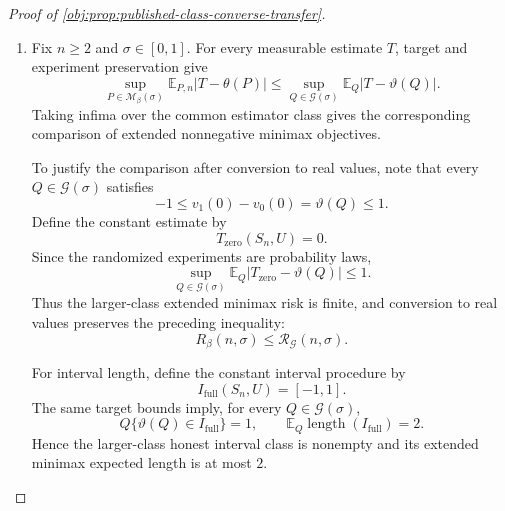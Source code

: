 \begin{proof}[Proof of \cref{obj:prop:published-class-converse-transfer}]
\begin{enumerate}
The embedding leaves the coordinates used by the observation map unchanged. Consequently,
\[
\vartheta(Q)=v_1(0)-v_0(0)=\theta(P),
\qquad
Q\circ(R,A,B)^{-1}=P_{\mathrm{obs}},
\]
and hence, for every integer \(n\ge0\),
\[
\bigl(Q\circ(R,A,B)^{-1}\bigr)^{\otimes n}
\otimes\operatorname{Unif}[0,1]
=
P_{\mathrm{obs}}^{\otimes n}
\otimes\operatorname{Unif}[0,1]
=
\mathbb P_{P,n}.
\]
At \(n=0\), the sample factor is the empty product probability law, so the identity also covers that case.

\item Fix \(n\ge2\) and \(\sigma\in[0,1]\). For every measurable estimate \(T\), target and experiment preservation give
\[
\sup_{P\in\mathcal M_\beta(\sigma)}
\mathbb E_{P,n}|T-\theta(P)|
\le
\sup_{Q\in\mathcal G(\sigma)}
\mathbb E_Q|T-\vartheta(Q)|.
\]
Taking infima over the common estimator class gives the corresponding comparison of extended nonnegative minimax objectives.

To justify the comparison after conversion to real values, note that every \(Q\in\mathcal G(\sigma)\) satisfies
\[
-1\le v_1(0)-v_0(0)=\vartheta(Q)\le1.
\]
Define the constant estimate by
\[
T_{\mathrm{zero}}(S_n,U)=0.
\]
Since the randomized experiments are probability laws,
\[
\sup_{Q\in\mathcal G(\sigma)}
\mathbb E_Q|T_{\mathrm{zero}}-\vartheta(Q)|
\le1.
\]
Thus the larger-class extended minimax risk is finite, and conversion to real values preserves the preceding inequality:
\[
R_\beta(n,\sigma)\le\mathcal R_{\mathcal G}(n,\sigma).
\]

For interval length, define the constant interval procedure by
\[
I_{\mathrm{full}}(S_n,U)=[-1,1].
\]
The same target bounds imply, for every \(Q\in\mathcal G(\sigma)\),
\[
Q\{\vartheta(Q)\in I_{\mathrm{full}}\}=1,
\qquad
\mathbb E_Q\operatorname{length}(I_{\mathrm{full}})=2.
\]
Hence the larger-class honest interval class is nonempty and its extended minimax expected length is at most \(2\).


\end{enumerate}
\end{proof}
